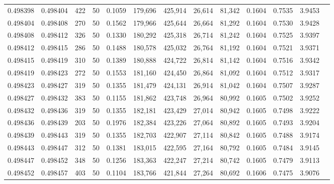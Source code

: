 \begin{tabular}{rrrrrrrrrrrrr}
0.498398 & 0.498404 & 422 &  50 &                                     0.1059 & 179,696 & 425,914 &  26,614 &  81,342 & 0.1604 & 0.7535 & 3.9453 \\
0.498404 & 0.498408 & 270 &  50 &                                     0.1562 & 179,966 & 425,644 &  26,664 &  81,292 & 0.1604 & 0.7530 & 3.9428 \\
0.498408 & 0.498412 & 326 &  50 &                                     0.1330 & 180,292 & 425,318 &  26,714 &  81,242 & 0.1604 & 0.7525 & 3.9397 \\
0.498412 & 0.498415 & 286 &  50 &                                     0.1488 & 180,578 & 425,032 &  26,764 &  81,192 & 0.1604 & 0.7521 & 3.9371 \\
0.498415 & 0.498419 & 310 &  50 &                                     0.1389 & 180,888 & 424,722 &  26,814 &  81,142 & 0.1604 & 0.7516 & 3.9342 \\
0.498419 & 0.498423 & 272 &  50 &                                     0.1553 & 181,160 & 424,450 &  26,864 &  81,092 & 0.1604 & 0.7512 & 3.9317 \\
0.498423 & 0.498427 & 319 &  50 &                                     0.1355 & 181,479 & 424,131 &  26,914 &  81,042 & 0.1604 & 0.7507 & 3.9287 \\
0.498427 & 0.498432 & 383 &  50 &                                     0.1155 & 181,862 & 423,748 &  26,964 &  80,992 & 0.1605 & 0.7502 & 3.9252 \\
0.498432 & 0.498436 & 319 &  50 &                                     0.1355 & 182,181 & 423,429 &  27,014 &  80,942 & 0.1605 & 0.7498 & 3.9222 \\
0.498436 & 0.498439 & 203 &  50 &                                     0.1976 & 182,384 & 423,226 &  27,064 &  80,892 & 0.1605 & 0.7493 & 3.9204 \\
0.498439 & 0.498443 & 319 &  50 &                                     0.1355 & 182,703 & 422,907 &  27,114 &  80,842 & 0.1605 & 0.7488 & 3.9174 \\
0.498443 & 0.498447 & 312 &  50 &                                     0.1381 & 183,015 & 422,595 &  27,164 &  80,792 & 0.1605 & 0.7484 & 3.9145 \\
0.498447 & 0.498452 & 348 &  50 &                                     0.1256 & 183,363 & 422,247 &  27,214 &  80,742 & 0.1605 & 0.7479 & 3.9113 \\
0.498452 & 0.498457 & 403 &  50 &                                     0.1104 & 183,766 & 421,844 &  27,264 &  80,692 & 0.1606 & 0.7475 & 3.9076 \\

\end{tabular}
